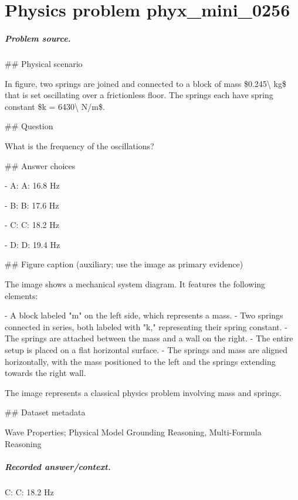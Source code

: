 
\chapter{Physics problem phyx\_mini\_0256}
\label{ch:PhyXMiniProblems_problem_phyx_mini_0256}

\paragraph{Problem source.}
\#\# Physical scenario

In figure, two springs are joined and connected to a block of mass \$0.245\textbackslash{} kg\$ that is set oscillating over a frictionless floor. The springs each have spring constant \$k = 6430\textbackslash{} N/m\$.

\#\# Question

What is the frequency of the oscillations?

\#\# Answer choices

- A: A: 16.8 Hz

- B: B: 17.6 Hz

- C: C: 18.2 Hz

- D: D: 19.4 Hz

\#\# Figure caption (auxiliary; use the image as primary evidence)

The image shows a mechanical system diagram. It features the following elements:

- A block labeled "m" on the left side, which represents a mass.
- Two springs connected in series, both labeled with "k," representing their spring constant.
- The springs are attached between the mass and a wall on the right.
- The entire setup is placed on a flat horizontal surface.
- The springs and mass are aligned horizontally, with the mass positioned to the left and the springs extending towards the right wall.

The image represents a classical physics problem involving mass and springs.

\#\# Dataset metadata

Wave Properties; Physical Model Grounding Reasoning, Multi-Formula Reasoning

\paragraph{Recorded answer/context.}
C: C: 18.2 Hz

